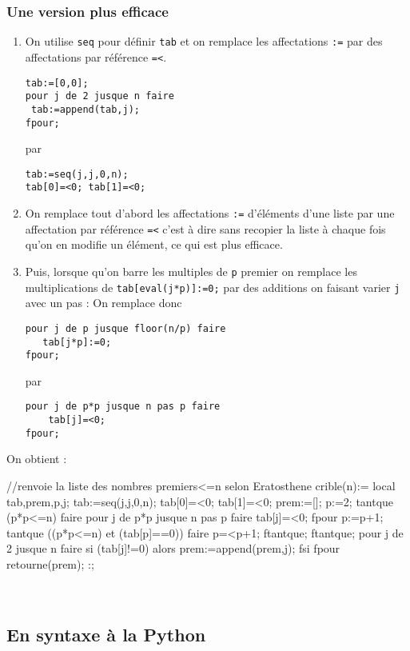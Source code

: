 \documentclass[12pt,a4paper]{book}
\begin{document}
\begin{giacjshere}
\subsubsection{Une version plus efficace}
\begin{enumerate}
\item On utilise {\tt seq} pour d\'efinir {\tt tab} et on remplace les 
affectations {\tt :=} par des affectations par r\'ef\'erence {\tt =<}. 
\begin{verbatim}
tab:=[0,0];
pour j de 2 jusque n faire
 tab:=append(tab,j);
fpour;
\end{verbatim}
par
\begin{verbatim}
tab:=seq(j,j,0,n);
tab[0]=<0; tab[1]=<0;
\end{verbatim}
\item On remplace tout d'abord les affectations {\tt :=} d'\'el\'ements d'une 
liste par une affectation par r\'ef\'erence {\tt =<} c'est \`a dire sans
recopier la liste \`a chaque fois qu'on en modifie un \'el\'ement,
ce qui est plus efficace.
\item Puis, lorsque qu'on barre les multiples de {\tt p} premier on remplace les
multiplications de {\tt tab[eval(j*p)]:=0;} par des additions on faisant varier 
{\tt j} avec un pas :
On remplace donc 
\begin{verbatim}
pour j de p jusque floor(n/p) faire
   tab[j*p]:=0;
fpour;
\end{verbatim}
par
\begin{verbatim}
pour j de p*p jusque n pas p faire
    tab[j]=<0;
fpour;
\end{verbatim}
\end{enumerate}
On obtient :
\begin{giaconload}
//renvoie la liste des nombres premiers<=n selon Eratosthene
crible(n):={
  local tab,prem,p,j;
  tab:=seq(j,j,0,n);
  tab[0]=<0; tab[1]=<0; 
  prem:=[];
  p:=2;
  tantque (p*p<=n) faire
    pour j de p*p jusque n pas p faire
      tab[j]=<0;
    fpour
    p:=p+1;
    tantque ((p*p<=n) et (tab[p]==0)) faire
      p=<p+1;
    ftantque;
  ftantque;
  pour j de 2 jusque n faire
    si (tab[j]!=0) alors 
      prem:=append(prem,j);
    fsi
  fpour
  retourne(prem);
}:;
\end{giaconload}
\\
\subsection{En syntaxe \`a la Python}

\end{giacjshere}
\end{document}
